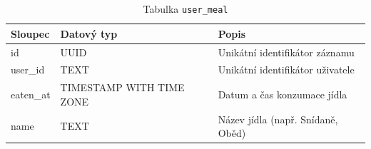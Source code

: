 \begin{table}[ht!]
    \centering
    \begin{tabularx}{\textwidth}{|l|l|L|}
        \hline
        \textbf{Sloupec} & \textbf{Datový typ}      & \textbf{Popis}                    \\ \hline
        id               & UUID                     & Unikátní identifikátor záznamu    \\ \hline
        user\_id         & TEXT                     & Unikátní identifikátor uživatele  \\ \hline
        eaten\_at        & TIMESTAMP WITH TIME ZONE & Datum a čas konzumace jídla       \\ \hline
        name             & TEXT                     & Název jídla (např. Snídaně, Oběd) \\ \hline
    \end{tabularx}
    \caption{Tabulka \texttt{user\_meal}}
    \label{tab:user_meal}
\end{table}
